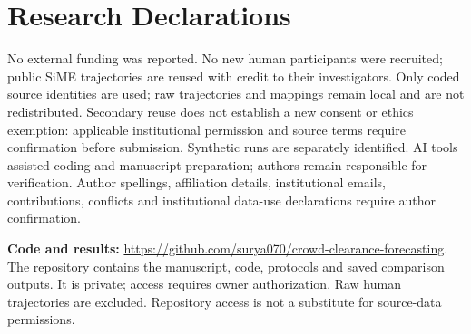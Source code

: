 \documentclass[conference]{IEEEtran}
\begin{document}
\section*{Research Declarations}
No external funding was reported. No new human participants were recruited; public SiME trajectories are reused with credit to their investigators. Only coded source identities are used; raw trajectories and mappings remain local and are not redistributed. Secondary reuse does not establish a new consent or ethics exemption: applicable institutional permission and source terms require confirmation before submission. Synthetic runs are separately identified. AI tools assisted coding and manuscript preparation; authors remain responsible for verification. Author spellings, affiliation details, institutional emails, contributions, conflicts and institutional data-use declarations require author confirmation.

\textbf{Code and results:} \url{https://github.com/surya070/crowd-clearance-forecasting}. The repository contains the manuscript, code, protocols and saved comparison outputs. It is private; access requires owner authorization. Raw human trajectories are excluded. Repository access is not a substitute for source-data permissions.
\end{document}
